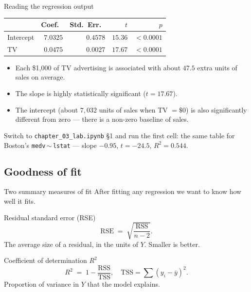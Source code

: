 \documentclass[aspectratio=169,11pt]{beamer}
\begin{document}
\begin{frame}{Reading the regression output}
  \begin{center}
  \begin{tabular}{lrrrr}
    \toprule
    & Coef.\ & Std.\ Err.\ & $t$ & $p$ \\
    \midrule
    Intercept & $7.0325$ & $0.4578$ & $15.36$ & $<0.0001$ \\
    TV        & $0.0475$ & $0.0027$ & $17.67$ & $<0.0001$ \\
    \bottomrule
  \end{tabular}
  \end{center}
  \begin{readme}
    \begin{itemize}
      \item Each \$1{,}000 of TV advertising is associated with about
            $47.5$ extra units of sales on average.
      \item The slope is highly statistically significant
            ($t = 17.67$).
      \item The intercept (about $7{,}032$ units of sales when TV $= \$0$)
            is also significantly different from zero --- there is a
            non-zero baseline of sales.
    \end{itemize}
  \end{readme}
  \begin{labnote}
    Switch to \texttt{chapter\_03\_lab.ipynb} \S1 and run the first cell: the
    same table for Boston's \texttt{medv}\,$\sim$\,\texttt{lstat} --- slope
    $-0.95$, $t=-24.5$, $R^2=0.544$.
  \end{labnote}
\end{frame}


\subsection{Goodness of fit}

\begin{frame}{Two summary measures of fit}
  After fitting any regression we want to know how well it fits.
  \begin{block}{Residual standard error (RSE)}
    \[
      \mathrm{RSE} \;=\; \sqrt{\frac{\mathrm{RSS}}{n - 2}}.
    \]
    The average size of a residual, in the units of $Y$. Smaller is
    better.
  \end{block}
  \begin{block}{Coefficient of determination $R^2$}
    \[
      R^2 \;=\; 1 - \frac{\mathrm{RSS}}{\mathrm{TSS}}, \quad
      \mathrm{TSS} = \sum (y_i - \bar y)^2.
    \]
    Proportion of variance in $Y$ that the model explains.
  \end{block}
\end{frame}
\end{document}
